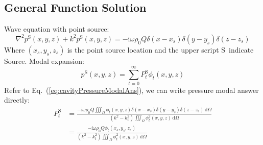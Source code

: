 \documentclass[a4paper,UTF8]{ctexart}
\begin{document}
	\subsection{General Function Solution}
	Wave equation with point source:
	\begin{equation}
	\label{eq:sourceRoomWaveEquation}
	\nabla^2p^\mathrm{S}\left(x,y,z\right) 
		+ k^2p^\mathrm{S}\left(x,y,z\right)
	= -\mathrm i\omega\rho_0 Q\delta\left(x-x_s\right)
		\delta\left(y-y_s\right)\delta\left(z-z_s\right)
	\end{equation}
	Where $\left(x_s,y_s,z_s\right)$ is the point source location and the upper script \textgravedbl S\textacutedbl\ indicate \textgravedbl Source\textacutedbl. Modal expansion:
	\begin{equation}
	\label{eq:souceRoomModalExpansion}
	p^\mathrm{S}\left(x,y,z\right)
	= \sum_{t=0}^{\infty} P_t^\mathrm{S}\phi_t\left(x,y,z\right)
	\end{equation}
	Refer to Eq.~(\ref{eq:cavityPressureModalAns}), we can write pressure modal answer directly:
	\begin{equation}
	\label{eq:sourceRoomPressureModalAns}
	\begin{split}
	P_t^\mathrm{S}
	&= \frac{-\mathrm i\omega\rho_0Q \iiint_\Omega
		\phi_t\left( x,y,z\right)
		\delta\left(x-x_s\right)
		\delta\left(y-y_s\right)
		\delta\left(z-z_s\right)\,\mathrm d\Omega}
	{\left(k^2-k_t^2 \right) 
		\iiint_\Omega\phi_t^2\left( x,y,z\right) \,\mathrm d\Omega }\\
	&= \frac{-\mathrm i\omega\rho_0Q\phi_t\left( x_s,y_s,z_s\right)}
	{\left(k^2-k_t^2 \right) 
		\iiint_\Omega\phi_t^2\left( x,y,z\right) \,\mathrm d\Omega }
	\end{split}
	\end{equation}
	
\end{document}
